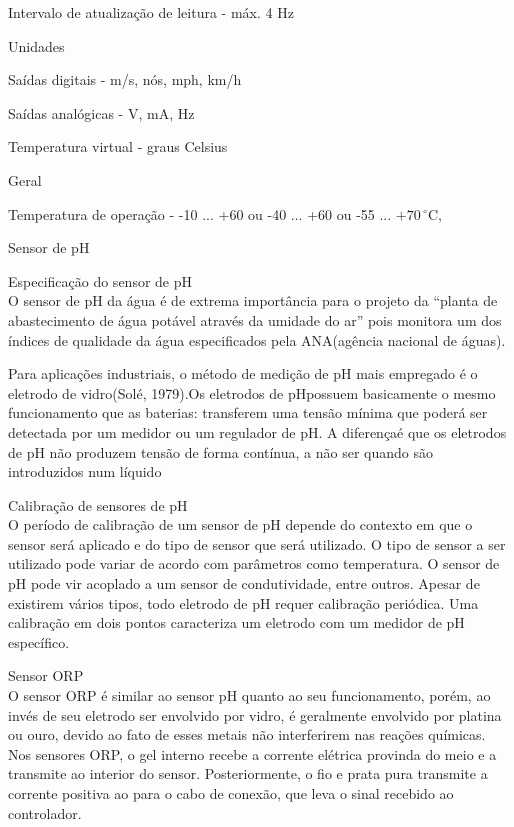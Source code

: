 \documentclass[12pt,openright,oneside,a4paper,brazil]{abntex2}
\begin{document}
Intervalo de atualização de leitura - máx. 4 Hz

Unidades

Saídas digitais - m/s, nós, mph, km/h

Saídas analógicas - V, mA, Hz

Temperatura virtual - graus Celsius

{\large Geral}

Temperatura de operação	- -10 ... +60 ou -40 ... +60 ou -55 ... $+70\,^{\circ}\mathrm{C}$,
\newpage

\begin{center}
 {\large Sensor de pH}\\[0.2cm]
 \end{center}
 
{\large Especificação do sensor de pH}\\
 O sensor de pH da água é de extrema importância para o projeto da “planta de abastecimento de água potável através da umidade do ar” pois monitora um dos índices de qualidade da água especificados pela ANA(agência nacional de águas). 
 
	Para aplicações industriais, o método de medição de pH mais empregado é o eletrodo de vidro(Solé, 1979).Os eletrodos de pHpossuem basicamente o mesmo funcionamento que as baterias: transferem uma tensão mínima que poderá ser detectada por um medidor ou um regulador de pH. A diferençaé que os eletrodos de pH não produzem tensão de forma contínua, a não ser quando são introduzidos num líquido

{\large Calibração de sensores de pH}\\
O período de calibração de um sensor de pH depende do contexto em que o sensor será aplicado e do tipo de sensor que será utilizado. O tipo de sensor a ser utilizado pode variar de acordo com parâmetros como temperatura. O sensor de pH pode vir acoplado a um sensor de condutividade, entre outros. Apesar de existirem vários tipos, todo eletrodo de pH requer calibração periódica. Uma calibração em dois pontos caracteriza um eletrodo com um medidor de pH específico.

{\large Sensor ORP}\\
O sensor ORP é similar ao sensor pH quanto ao seu funcionamento, porém, ao invés de seu eletrodo ser envolvido por vidro, é geralmente envolvido por platina ou ouro, devido ao fato de esses metais não interferirem nas reações químicas. Nos sensores ORP, o gel interno recebe a corrente elétrica provinda do meio e a transmite ao interior do sensor. Posteriormente, o fio e prata pura transmite a corrente positiva ao para o cabo de conexão, que leva o sinal recebido ao controlador.
\newpage
\end{document}
